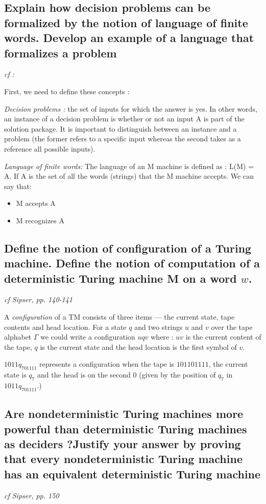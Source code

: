 \documentclass[main.tex]{subfiles}
\begin{document}
\subsection{Explain how decision problems can be formalized by the notion of language of finite words. Develop an example of a language that formalizes a problem}
\emph{cf : \cite{2018}}

First, we need to define these concepts :
\par\textit{Decision problems :} the set of inputs for which the answer is yes.
    In other words, an instance of a decision problem is whether or not
an input A is part of the solution package. It is important to distinguish
between an instance and a problem (the former refers to a specific input whereas the
second takes as a reference all possible inputs).
\par\textit{Language of finite words:} The language of an M machine is defined as : L(M) = A. If A is the set
of all the words (strings) that the M machine accepts.
We can say that:
\begin{itemize}
    \item M accepts A
    \item M recognizes A
\end{itemize}


\subsection{Define the notion of configuration of a Turing machine. Define the notion of computation of a deterministic Turing machine M on a word $w$.}
\emph{cf Sipser, pp. 140-141}

A \emph{configuration} of a TM consists of three items --- the current state, tape contents 
and head location. For a state $q$ and two strings $u$ and $v$ over the tape alphabet $\Gamma$ we could write a configuration $uqv$ where : $uv$ is the current content of the tape,
$q$ is the current state and the head location is the first symbol of $v$.

$1011q_701111$ represents a configuration when the tape is $101101111$, the current state is $q_7$ and the head is on the second $0$ (given by the position of $q_7$ in $1011q_701111$.)


\subsection{Are nondeterministic Turing machines more powerful than deterministic Turing machines as deciders ?Justify your answer by proving that every nondeterministic Turing machine has an equivalent deterministic Turing machine}
\emph{cf Sipser, pp. 150}
\end{document}
